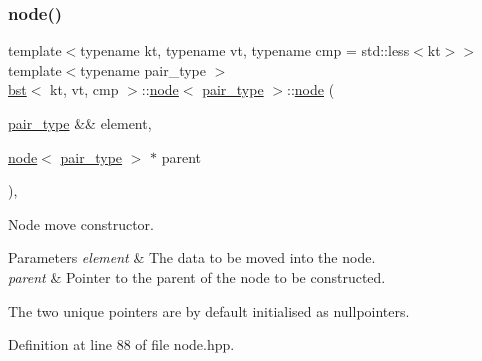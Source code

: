 \mbox{\label{structbst_1_1node_afb49ebb92c139b1a3fdaf71048b0dc1a}} 
\subsubsection{\texorpdfstring{node()}{node()}\hspace{0.1cm}{\footnotesize\ttfamily [3/5]}}
{\footnotesize\ttfamily template$<$typename kt, typename vt, typename cmp = std\+::less$<$kt$>$$>$ \\
template$<$typename pair\+\_\+type $>$ \\
\hyperlink{classbst}{bst}$<$ kt, vt, cmp $>$\+::\hyperlink{structbst_1_1node}{node}$<$ \hyperlink{classbst_a7b11cca2a3b4394915600194f741ab16}{pair\+\_\+type} $>$\+::\hyperlink{structbst_1_1node}{node} (\begin{DoxyParamCaption}\item[{\hyperlink{classbst_a7b11cca2a3b4394915600194f741ab16}{pair\+\_\+type} \&\&}]{element,  }\item[{\hyperlink{structbst_1_1node}{node}$<$ \hyperlink{classbst_a7b11cca2a3b4394915600194f741ab16}{pair\+\_\+type} $>$ $\ast$}]{parent }\end{DoxyParamCaption})\hspace{0.3cm}{\ttfamily [inline]}, {\ttfamily [noexcept]}}



Node move constructor. 


\begin{DoxyParams}{Parameters}
{\em element} & The data to be moved into the node. \\
\hline
{\em parent} & Pointer to the parent of the node to be constructed.\\
\hline
\end{DoxyParams}
The two unique pointers are by default initialised as nullpointers. 

Definition at line 88 of file node.\+hpp.

\mbox{\label{structbst_1_1node_a9970c480ef885a64710303bc9e3e6558}} 
